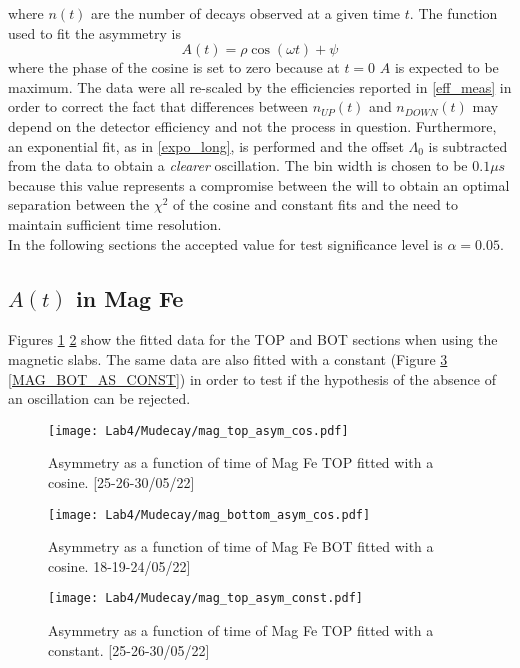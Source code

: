 \documentclass[10pt,a4paper,twocolumn]{article}
\begin{document}
where $n(t)$ are the number of decays observed at a given time $t$. The function used to fit the asymmetry is
\begin{equation}
\label{asym}
    A(t) = \rho\cos(\omega t )+\psi
\end{equation}
where the phase of the cosine is set to zero because at $t=0$ $A$ is expected to be maximum. 
The data were all re-scaled by the efficiencies reported in \ref{eff_meas} in order to correct the fact that differences between $n_{UP}(t)$ and $n_{DOWN}(t)$ may depend on the detector efficiency and not the process in question.
Furthermore, an exponential fit, as in \ref{expo_long}, is performed and the offset $\Lambda_0$ is subtracted from the data to obtain a \textit{clearer} oscillation.
The bin width is chosen to be $0.1 \mu s$ because this value represents a compromise between the will to obtain an optimal separation between the $\chi^2$ of the cosine and constant fits and the need to maintain sufficient time resolution.
\\
In the following sections the accepted value for test significance level is $\alpha=0.05$.

\subsection{$A(t)$ in Mag Fe}

Figures \ref{MAG_TOP_AS} \ref{MAG_BOT_AS} show the fitted data for the TOP and BOT sections when using the magnetic slabs. The same data are also fitted with a constant (Figure \ref{MAG_TOP_AS_CONST} \ref{MAG_BOT_AS_CONST}) in order to test if the hypothesis of the absence of an oscillation can be rejected. 


\begin{figure}[h!]
\centering
\caption{Asymmetry as a function of time of Mag Fe TOP fitted with a cosine. [25-26-30/05/22]}
\texttt{[image: Lab4/Mudecay/mag\_top\_asym\_cos.pdf]} 
\label{MAG_TOP_AS}
\end{figure}

\begin{figure}[h!]
\centering
\caption{Asymmetry as a function of time of Mag Fe BOT fitted with a cosine. 18-19-24/05/22]}
\texttt{[image: Lab4/Mudecay/mag\_bottom\_asym\_cos.pdf]} 
\label{MAG_BOT_AS}
\end{figure}

\begin{figure}[h!]
\centering
\caption{Asymmetry as a function of time of Mag Fe TOP fitted with a constant. [25-26-30/05/22]}
\texttt{[image: Lab4/Mudecay/mag\_top\_asym\_const.pdf]} 
\label{MAG_TOP_AS_CONST}
\end{figure}
\end{document}

